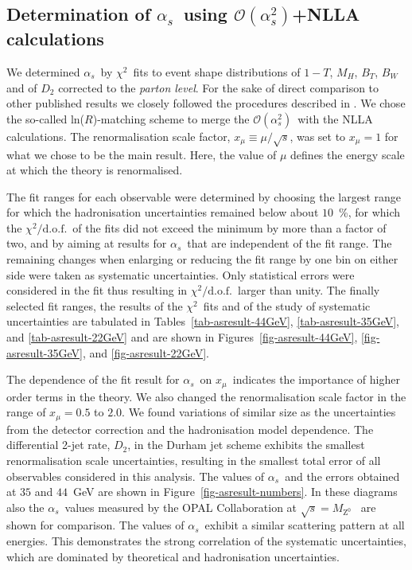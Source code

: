 \documentclass[12pt,a4paper,twoside]{article}
\newcommand{\as}     {\ensuremath{\alpha_s}}
\newcommand{\oaa}    {\ensuremath{\mathcal{O}(\alpha_s^2)}}
\newcommand{\mz}     {\ensuremath{M_{\mathrm{Z^0}}}}
\newcommand{\chisq}  {\ensuremath{\chi^2}}
\newcommand{\chisqd} {\ensuremath{\chi^2/\mathrm{d.o.f.}}}
\newcommand{\xmu}    {\ensuremath{x_{\mu}}}
\begin{document}
\subsection{ Determination of \as\ using \oaa+NLLA calculations}
We determined \as\ by \chisq\ fits to event 
shape distributions of $1-T$, $M_H$, $B_T$, $B_W$ and of $D_2$
corrected to the {\em parton level}.
For the sake of direct comparison to other published results we 
closely followed the procedures described in 
\cite{bib-OPALresummed,bib-eventshapes,bib-OPALNLLA}. 
We chose the so-called ln($R$)-matching
scheme to merge the \oaa\ with the NLLA calculations. 
The renormalisation scale factor, $\xmu \equiv \mu/\sqrt{s}$, was
set to $\xmu = 1$ for what we chose to be the main result. 
Here, the value of $\mu$ defines 
the energy scale at which the theory is renormalised. 

The fit ranges for each observable were determined   
by choosing the largest range for which the hadronisation
uncertainties remained 
below about $10$~\%, 
for which the \chisqd\ of the fits did not
exceed the minimum by more than a factor of two, 
and by 
aiming at results for \as\ that are independent of the fit range.        
The remaining 
changes when      
enlarging or reducing the fit range by one bin on either side   
were taken as systematic uncertainties.
Only statistical errors were considered in the fit thus resulting in   
\chisqd\ larger than unity.                                            
The finally selected fit ranges, the results of the \chisq\ fits and of 
the study of systematic uncertainties are 
tabulated in Tables~\ref{tab-asresult-44GeV}, \ref{tab-asresult-35GeV}, 
and \ref{tab-asresult-22GeV} and are shown in Figures~\ref{fig-asresult-44GeV},
\ref{fig-asresult-35GeV}, and \ref{fig-asresult-22GeV}. 

The dependence of the 
fit result for \as\ on \xmu\ indicates the importance of higher order 
terms in the theory. 
We also changed the renormalisation
scale factor in the range of $\xmu = 0.5$ to $2.0$. 
We found variations of similar size as the
uncertainties from the detector correction and the 
hadronisation model dependence. The differential 2-jet rate, $D_2$,
in the Durham jet scheme exhibits the smallest 
renormalisation scale uncertainties, resulting in 
the smallest total error of all observables
considered in this analysis. The values of \as\ and the errors obtained
at $35$ and $44$~GeV are shown in Figure~\ref{fig-asresult-numbers}.
In these diagrams also the \as\ values measured by the OPAL
Collaboration at $\sqrt{s} = \mz$~\cite{bib-OPALresummed} are shown for 
comparison. 
The values of \as\ exhibit a similar scattering pattern at all energies.
This demonstrates the strong correlation of the systematic
uncertainties, which are dominated by theoretical and hadronisation
uncertainties. 
\end{document}
